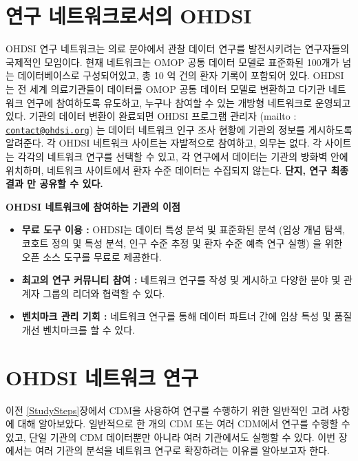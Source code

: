 \documentclass[11pt]{book}
\providecommand{\tightlist}{%
  \setlength{\itemsep}{0pt}\setlength{\parskip}{0pt}}
\theoremstyle{definition}
\theoremstyle{definition}
\theoremstyle{definition}
\theoremstyle{remark}
\let\BeginKnitrBlock\begin \let\EndKnitrBlock\end
\begin{document}
\section{연구 네트워크로서의 OHDSI}\label{--ohdsi}


OHDSI 연구 네트워크는 의료 분야에서 관찰 데이터 연구를 발전시키려는
연구자들의 국제적인 모임이다. 현재 네트워크는 OMOP 공통 데이터 모델로
표준화된 100개가 넘는 데이터베이스로 구성되어있고, 총 10 억 건의 환자
기록이 포함되어 있다. OHDSI는 전 세계 의료기관들이 데이터를 OMOP 공통
데이터 모델로 변환하고 다기관 네트워크 연구에 참여하도록 유도하고,
누구나 참여할 수 있는 개방형 네트워크로 운영되고 있다. 기관의 데이터
변환이 완료되면 OHDSI 프로그램 관리자 (mailto :
\href{mailto:contact@ohdsi.org}{\nolinkurl{contact@ohdsi.org}}) 는
데이터 네트워크 인구 조사 현황에 기관의 정보를 게시하도록 알려준다. 각
OHDSI 네트워크 사이트는 자발적으로 참여하고, 의무는 없다. 각 사이트는
각각의 네트워크 연구를 선택할 수 있고, 각 연구에서 데이터는 기관의
방화벽 안에 위치하며, 네트워크 사이트에서 환자 수준 데이터는 수집되지
않는다. \textbf{단지, 연구 최종 결과 만 공유할 수 있다.}

\BeginKnitrBlock{rmdimportant}
\textbf{OHDSI 네트워크에 참여하는 기관의 이점}

\begin{itemize}
\tightlist
\item
  \textbf{무료 도구 이용 :} OHDSI는 데이터 특성 분석 및 표준화된 분석
  (임상 개념 탐색, 코호트 정의 및 특성 분석, 인구 수준 추정 및 환자 수준
  예측 연구 실행) 을 위한 오픈 소스 도구를 무료로 제공한다.
\item
  \textbf{최고의 연구 커뮤니티 참여 :} 네트워크 연구를 작성 및 게시하고
  다양한 분야 및 관계자 그룹의 리더와 협력할 수 있다.
\item
  \textbf{벤치마크 관리 기회 :} 네트워크 연구를 통해 데이터 파트너 간에
  임상 특성 및 품질 개선 벤치마크를 할 수 있다.
\end{itemize}
\EndKnitrBlock{rmdimportant}

\section{OHDSI 네트워크 연구}\label{ohdsi--}


이전 \ref{StudySteps}장에서 CDM을 사용하여 연구를 수행하기 위한 일반적인
고려 사항에 대해 알아보았다. 일반적으로 한 개의 CDM 또는 여러 CDM에서
연구를 수행할 수 있고, 단일 기관의 CDM 데이터뿐만 아니라 여러 기관에서도
실행할 수 있다. 이번 장에서는 여러 기관의 분석을 네트워크 연구로
확장하려는 이유를 알아보고자 한다.
\end{document}
